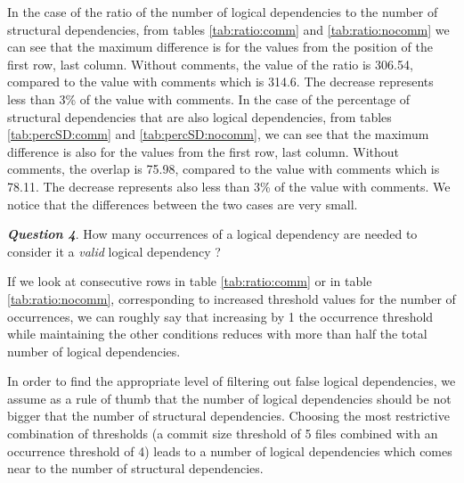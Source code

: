 \documentclass[a4paper,twoside]{article}
\begin{document}
In the case of the ratio of the number of logical dependencies to the number of structural dependencies, from tables \ref{tab:ratio:comm} and \ref{tab:ratio:nocomm} we can see that the maximum difference is for the values from the position of the first row, last column. Without comments, the value of the ratio is 306.54, compared to the value with comments which is 314.6. The decrease represents less than 3\% of the value with comments. In the case of the percentage of structural dependencies that are also logical dependencies, from tables \ref{tab:percSD:comm} and \ref{tab:percSD:nocomm}, we can see that the maximum difference is also for the values from the first row, last column. Without comments, the overlap is 75.98, compared to the value with comments which is 78.11.  The decrease represents also less than 3\% of the value with comments. We notice that the differences between the two cases are very small. %



\textit{\textbf{Question 4}}. How many occurrences of a logical dependency are needed to consider it a \textit{valid} logical dependency ? 

If we look at consecutive rows in table \ref{tab:ratio:comm} or in table \ref{tab:ratio:nocomm}, corresponding to increased threshold values for the number of occurrences, we can roughly say that  increasing by 1 the occurrence threshold while maintaining the other conditions reduces with more than half the total number of logical dependencies.  

In order to find the appropriate level of filtering out false logical dependencies, we assume as a rule of thumb that the number of logical dependencies should be not bigger that the number of structural dependencies. Choosing the most restrictive combination of thresholds (a commit size threshold of 5 files combined with an occurrence threshold of 4) leads to a number of logical dependencies which comes near to the number of structural dependencies.

\end{document}
